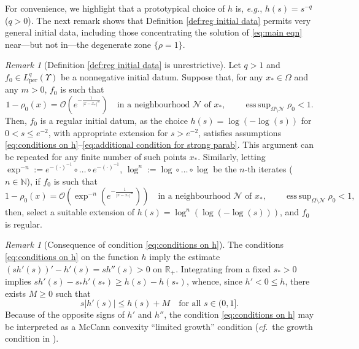 \documentclass[11pt,a4paper,reqno]{amsart}
\theoremstyle{remark}
\newtheorem{rem}[prop]{Remark}
\theoremstyle{definition}
\numberwithin{equation}{section}
\newcommand{\per}{\mathrm{per}}
\DeclareMathOperator{\esssup}{ess \, sup}
\begin{document}
For convenience, we highlight that a prototypical choice of $h$ is, \textit{e.g.}, $h(s) = s^{-q}$ ($q>0$). The next remark shows that Definition \ref{def:reg initial data} permits very general initial data, including those  concentrating the solution of \eqref{eq:main eqn} near---but not in---the degenerate zone $\{\rho=1\}$.

\begin{rem}[Definition \ref{def:reg initial data} is unrestrictive] Let $q > 1$ and $f_0 \in L^q_\per(\Upsilon)$ be a nonnegative initial datum. Suppose that, for any $x_* \in \Omega$ and any $m > 0$, $f_0$ is such that 
$$1-\rho_0(x) = \mathcal{O}(e^{-\frac{1}{|x-x_*|^{m}}}) \quad \text{in a neighbourhood } \mathcal{N} \text{ of } x_*, \qquad \esssup_{\Omega \setminus \mathcal{N}}\rho_0 <1.$$Then, $f_0$ is a regular initial datum, as the choice $h(s) = \log(-\log(s))$ for $0 < s \leq e^{-2}$, with appropriate extension for $s > e^{-2}$, satisfies assumptions \eqref{eq:conditions on h}--\eqref{eq:additional condition for strong parab}. This argument can be repeated for any finite number of such points $x_*$. Similarly, letting $\exp^{-n} := e^{-(\cdot)^{-1}} \circ \dots \circ e^{-(\cdot)^{-1}}$, $\log^n := \log \circ \dots \circ \log$ be the $n$-th iterates ($n\in\mathbb{N}$), if $f_0$ is such that 
$$1-\rho_0(x) = \mathcal{O}(\exp^{-n}(e^{-\frac{1}{|x-x_*|^{m}}})) \quad \text{in a neighbourhood } \mathcal{N} \text{ of } x_*, \qquad \esssup_{\Omega \setminus \mathcal{N}}\rho_0 <1,$$ then, select a suitable extension of $h(s) = \log^n(\log(-\log(s)))$, and $f_0$ is regular. 
\end{rem}





\begin{rem}[Consequence of condition \eqref{eq:conditions on h}]
The conditions \eqref{eq:conditions on h} on the function $h$ imply  the estimate $( sh'(s))' - h'(s) = s h''(s) > 0$ on $\mathbb{R}_+$. Integrating from a fixed $s_* > 0$ implies $s h'(s) - s_* h'(s_*) \geq   h(s) - h(s_*) $, whence, since $h' < 0\leq h$, there exists $M \geq 0$ such that 
\begin{equation}\label{eq:third condition on initial data}
    s |h'(s)| \leq h(s) + M \quad \text{for all } s \in (0,1]. 
\end{equation}    
Because of the opposite signs of $h'$ and $h''$, the condition \eqref{eq:conditions on h} may be interpreted as a McCann convexity ``limited growth'' condition (\textit{cf.}~the growth condition in \cite[\S 3]{mccann}). 
\end{rem}
\end{document}
